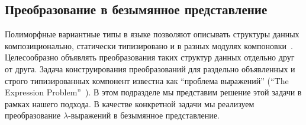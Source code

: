 %
%
%

%
%
%

\subsection{Преобразование в безымянное представление}
\label{sec:nameless}

Полиморфные вариантные типы в языке \ocaml{} позволяют описывать структуры данных композиционально, статически типизировано и в разных модулях компоновки~\cite{PolyVarReuse}.
Целесообразно объявлять преобразования таких структур данных отдельно друг от друга. Задача конструирования преобразований для 
раздельно объявленных и строго типизированных компонент известна как ``проблема выражений'' (``The Expression Problem''~\cite{ExpressionProblem}).
В этом подразделе мы представим решение этой задачи в рамках нашего подхода. В качестве конкретной задачи мы реализуем преобразование $\lambda$-выражений в безымянное представление.

